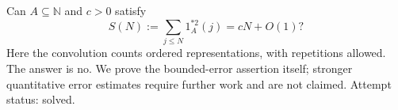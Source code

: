 Can \(A\subseteq\mathbb N\) and \(c>0\) satisfy
\[
S(N):=\sum_{j\leq N}1_A^{*2}(j)=cN+O(1)?
\]
Here the convolution counts ordered representations, with repetitions allowed. The answer is no. We prove the bounded-error assertion itself; stronger quantitative error estimates require further work and are not claimed. Attempt status: solved.
